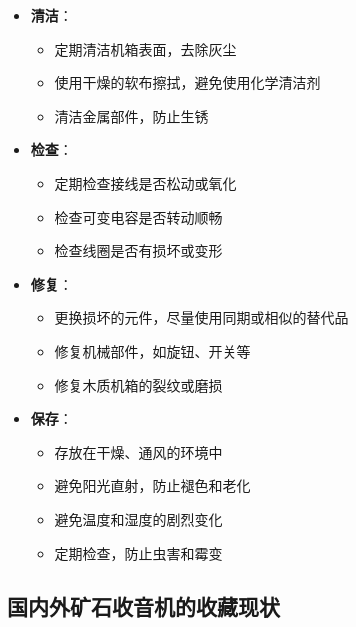 \documentclass[12pt,UTF8]{ctexbook}
\begin{document}
\begin{itemize}[leftmargin=3.5em]
    \item \textbf{清洁}：
        \begin{itemize}[leftmargin=3.5em]
            \item 定期清洁机箱表面，去除灰尘
            \item 使用干燥的软布擦拭，避免使用化学清洁剂
            \item 清洁金属部件，防止生锈
        \end{itemize}
    \item \textbf{检查}：
        \begin{itemize}[leftmargin=3.5em]
            \item 定期检查接线是否松动或氧化
            \item 检查可变电容是否转动顺畅
            \item 检查线圈是否有损坏或变形
        \end{itemize}
    \item \textbf{修复}：
        \begin{itemize}[leftmargin=3.5em]
            \item 更换损坏的元件，尽量使用同期或相似的替代品
            \item 修复机械部件，如旋钮、开关等
            \item 修复木质机箱的裂纹或磨损
        \end{itemize}
    \item \textbf{保存}：
        \begin{itemize}[leftmargin=3.5em]
            \item 存放在干燥、通风的环境中
            \item 避免阳光直射，防止褪色和老化
            \item 避免温度和湿度的剧烈变化
            \item 定期检查，防止虫害和霉变
        \end{itemize}
\end{itemize}

\subsection{国内外矿石收音机的收藏现状}
\end{document}

